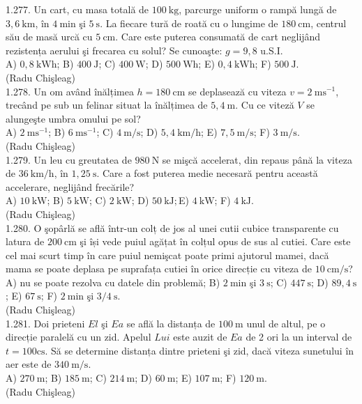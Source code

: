 {1.277. Un cart, cu masa totală de $100 \mathrm{~kg}$, parcurge uniform o rampă lungă de $3,6 \mathrm{~km}$, în $4 \mathrm{~min}$ şi $5 \mathrm{~s}$. La fiecare tură de roată cu o lungime de $180 \mathrm{~cm}$, centrul său de masă urcă cu $5 \mathrm{~cm}$. Care este puterea consumată de cart neglijând rezistența aerului şi frecarea cu solul? Se cunoaşte: $g=9,8$ u.S.I.\\ A) $0,8 \mathrm{~kWh}$; B) $400 \mathrm{~J}$; C) $400 \mathrm{~W}$; D) $500 \mathrm{~Wh}$; E) $0,4 \mathrm{~kWh}$; F) $500 \mathrm{~J}$.\\ (Radu Chişleag)\\

1.278. Un om având înălțimea $h=180 \mathrm{~cm}$ se deplasează cu viteza $v=2 \mathrm{~ms}^{-1}$, trecând pe sub un felinar situat la înălțimea de $5,4 \mathrm{~m}$. Cu ce viteză $V$ se alungeşte umbra omului pe sol?\\ A) $2 \mathrm{~ms}^{-1}$; B) $6 \mathrm{~ms}^{-1}$; C) $4 \mathrm{~m} / \mathrm{s}$; D) $5,4 \mathrm{~km} / \mathrm{h}$; E) $7,5 \mathrm{~m} / \mathrm{s}$; F) $3 \mathrm{~m} / \mathrm{s}$.\\ (Radu Chişleag)\\

1.279. Un leu cu greutatea de $980 \mathrm{~N}$ se mişcă accelerat, din repaus până la viteza de $36 \mathrm{~km} / \mathrm{h}$, în $1,25 \mathrm{~s}$. Care a fost puterea medie necesară pentru această accelerare, neglijând frecările?\\ A) $10 \mathrm{~kW}$; B) $5 \mathrm{~kW}$; C) $2 \mathrm{~kW}$; D) $50 \mathrm{~kJ}; $E) $4 \mathrm{~kW}$; F) $4 \mathrm{~kJ}$.\\ (Radu Chişleag)\\

1.280. O şopârlă se află într-un colț de jos al unei cutii cubice transparente cu latura de $200 \mathrm{~cm}$ şi își vede puiul agățat în colțul opus de sus al cutiei. Care este cel mai scurt timp în care puiul nemişcat poate primi ajutorul mamei, dacă mama se poate deplasa pe suprafața cutiei în orice direcție cu viteza de $10 \mathrm{~cm} / \mathrm{s}$?\\ A) nu se poate rezolva cu datele din problemă; B) $2 \mathrm{~min}$ şi $3 \mathrm{~s}$; C) $447 \mathrm{~s}$; D) $89,4 \mathrm{~s}$; E) $67 \mathrm{~s}$; F) $2 \mathrm{~min}$ şi $3 / 4 \mathrm{~s}$.\\ (Radu Chişleag)\\

1.281. Doi prieteni $El$ şi $Ea$ se află la distanța de $100 \mathrm{~m}$ unul de altul, pe o direcție paralelă cu un zid. Apelul $Lui$ este auzit de $Ea$ de 2 ori la un interval de $t=100 \mathrm{cs}$. Să se determine distanța dintre prieteni şi zid, dacă viteza sunetului în aer este de $340 \mathrm{~m} / \mathrm{s}$.\\ A) $270 \mathrm{~m}$; B) $185 \mathrm{~m}$; C) $214 \mathrm{~m}$; D) $60 \mathrm{~m}$; E) $107 \mathrm{~m}$; F) $120 \mathrm{~m}$.\\ (Radu Chişleag)\\

}
